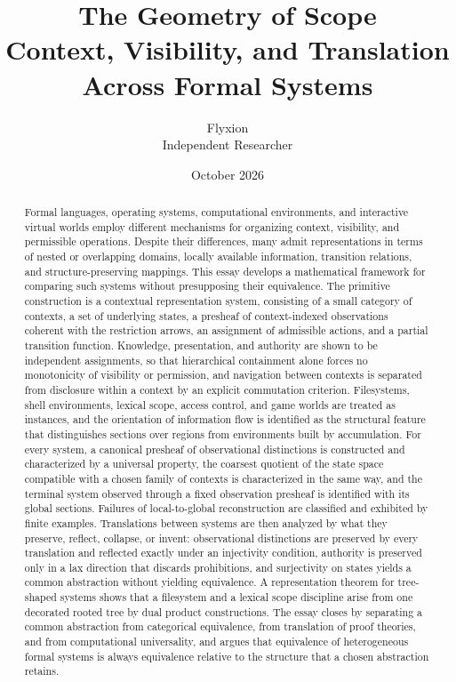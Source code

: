 \documentclass[11pt]{article}
\title{The Geometry of Scope\\[0.5em]\large Context, Visibility, and Translation Across Formal Systems}
\author{Flyxion\\[0.2em]\small Independent Researcher}
\date{October 2026}
\theoremstyle{definition}
\theoremstyle{remark}
\begin{document}
\maketitle

\begin{abstract}
\noindent Formal languages, operating systems, computational environments, and interactive virtual worlds employ different mechanisms for organizing context, visibility, and permissible operations. Despite their differences, many admit representations in terms of nested or overlapping domains, locally available information, transition relations, and structure-preserving mappings. This essay develops a mathematical framework for comparing such systems without presupposing their equivalence. The primitive construction is a contextual representation system, consisting of a small category of contexts, a set of underlying states, a presheaf of context-indexed observations coherent with the restriction arrows, an assignment of admissible actions, and a partial transition function. Knowledge, presentation, and authority are shown to be independent assignments, so that hierarchical containment alone forces no monotonicity of visibility or permission, and navigation between contexts is separated from disclosure within a context by an explicit commutation criterion. Filesystems, shell environments, lexical scope, access control, and game worlds are treated as instances, and the orientation of information flow is identified as the structural feature that distinguishes sections over regions from environments built by accumulation. For every system, a canonical presheaf of observational distinctions is constructed and characterized by a universal property, the coarsest quotient of the state space compatible with a chosen family of contexts is characterized in the same way, and the terminal system observed through a fixed observation presheaf is identified with its global sections. Failures of local-to-global reconstruction are classified and exhibited by finite examples. Translations between systems are then analyzed by what they preserve, reflect, collapse, or invent: observational distinctions are preserved by every translation and reflected exactly under an injectivity condition, authority is preserved only in a lax direction that discards prohibitions, and surjectivity on states yields a common abstraction without yielding equivalence. A representation theorem for tree-shaped systems shows that a filesystem and a lexical scope discipline arise from one decorated rooted tree by dual product constructions. The essay closes by separating a common abstraction from categorical equivalence, from translation of proof theories, and from computational universality, and argues that equivalence of heterogeneous formal systems is always equivalence relative to the structure that a chosen abstraction retains.
\end{abstract}
\end{document}

